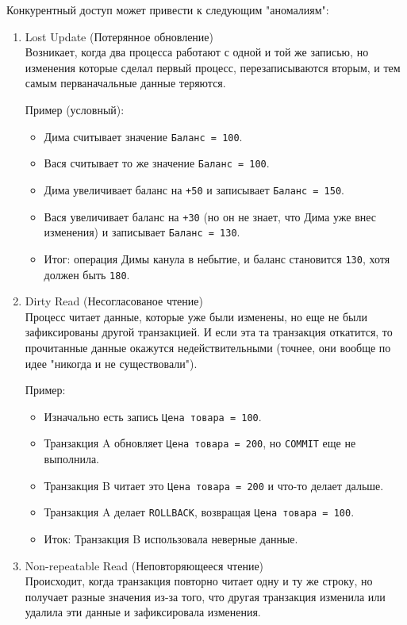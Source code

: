 Конкурентный доступ может привести к следующим "аномалиям":
\begin{enumerate}
    \item Lost Update (Потерянное обновление) ~\\
    Возникает, когда два процесса работают с одной и той же записью, но изменения которые сделал первый процесс, перезаписываются вторым, и тем самым перваначальные данные теряются.
    
    Пример (условный):
    \begin{itemize}
        \item Дима считывает значение \texttt{Баланс = 100}.
        \item Вася считывает то же значение \texttt{Баланс = 100}.
        \item Дима увеличивает баланс на \texttt{+50} и записывает \texttt{Баланс = 150}.
        \item Вася увеличивает баланс на \texttt{+30} (но он не знает, что Дима уже внес изменения) и записывает \texttt{Баланс = 130}.
        \item Итог: операция Димы канула в небытие, и баланс становится \texttt{130}, хотя должен быть \texttt{180}.
    \end{itemize}

    \item Dirty Read (Несогласованое чтение) ~\\
    Процесс читает данные, которые уже были изменены, но еще не были зафиксированы другой транзакцией. И если эта та транзакция откатится, то прочитанные данные окажутся недействительными (точнее, они вообще по идее "никогда и не существовали").
    
    Пример:
    \begin{itemize}
        \item Изначально есть запись \texttt{Цена товара = 100}.
        \item Транзакция A обновляет \texttt{Цена товара = 200}, но \texttt{COMMIT} еще не выполнила.
        \item Транзакция B читает это \texttt{Цена товара = 200} и что-то делает дальше.
        \item Транзакция A делает \texttt{ROLLBACK}, возвращая \texttt{Цена товара = 100}.
        \item Иток: Транзакция B использовала неверные данные.
    \end{itemize}

    \item Non-repeatable Read (Неповторяющееся чтение) ~\\
    Происходит, когда транзакция повторно читает одну и ту же строку, но получает разные значения из-за того, что другая транзакция изменила или удалила эти данные и зафиксировала изменения.


\end{enumerate}
